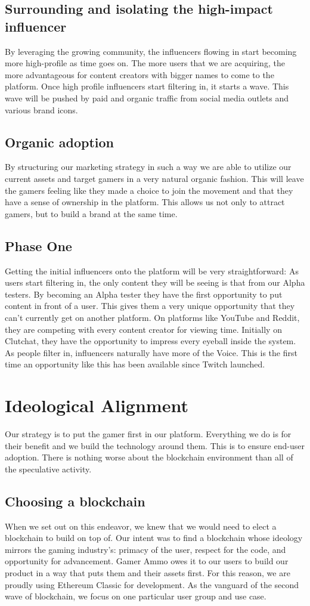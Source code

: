 \documentclass[11pt]{report}
\begin{document}
\subsection{Surrounding and isolating the high-impact influencer}
By leveraging the growing community, the influencers flowing in start becoming more high-profile as time goes on. The more users that we are acquiring, the more advantageous for content creators with bigger names to come to the platform. Once high profile influencers start filtering in, it starts a wave. This wave will be pushed by paid and organic traffic from social media outlets and various brand icons. 
\subsection{Organic adoption}
By structuring our marketing strategy in such a way we are able to utilize our current assets and target gamers in a very natural organic fashion. This will leave the gamers feeling like they made a choice to join the movement and that they have a sense of ownership in the platform. This allows us not only to attract gamers, but to build a brand at the same time.
\subsection{Phase One}
Getting the initial influencers onto the platform will be very straightforward: As users start filtering in, the only content they will be seeing is that from our Alpha testers. By becoming an Alpha tester they have the first opportunity to put content in front of a user. This gives them a very unique opportunity that they can’t currently get on another platform. On platforms like YouTube and Reddit, they are competing with every content creator for viewing time. Initially on Clutchat, they have the opportunity to impress every eyeball inside the system. As people filter in, influencers naturally have more of the Voice. This is the first time an opportunity like this has been available since Twitch launched.
\section{Ideological Alignment}
Our strategy is to put the gamer first in our platform. Everything we do is for their benefit and we build the technology around them. This is to ensure end-user adoption. There is nothing worse about the blockchain environment than all of the speculative activity.
\subsection{Choosing a blockchain}
When we set out on this endeavor, we knew that we would need to elect a blockchain to build on top of. Our intent was to find a blockchain whose ideology mirrors the gaming industry’s: primacy of the user, respect for the code, and opportunity for advancement. Gamer Ammo owes it to our users to build our product in a way that puts them and their assets first. For this reason, we are proudly using Ethereum Classic for development. As the vanguard of the second wave of blockchain, we focus on one particular user group and use case.
\end{document}

